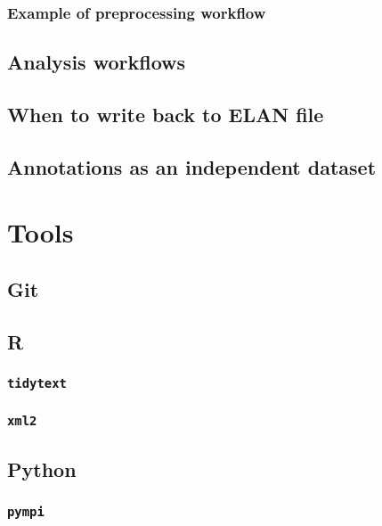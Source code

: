 \documentclass[]{book}
\theoremstyle{definition}
\theoremstyle{definition}
\theoremstyle{definition}
\theoremstyle{remark}
\begin{document}
\subsection{Example of preprocessing
workflow}\label{example-of-preprocessing-workflow}

\section{Analysis workflows}\label{analysis-workflows}

\section{When to write back to ELAN
file}\label{when-to-write-back-to-elan-file}

\section{Annotations as an independent
dataset}\label{annotations-as-an-independent-dataset}

\chapter{Tools}\label{tools}

\section{Git}\label{git}

\section{R}\label{r}

\subsection{\texorpdfstring{\texttt{tidytext}}{tidytext}}\label{tidytext}

\subsection{\texorpdfstring{\texttt{xml2}}{xml2}}\label{xml2}

\section{Python}\label{python}

\subsection{\texorpdfstring{\texttt{pympi}}{pympi}}\label{pympi}
\end{document}
